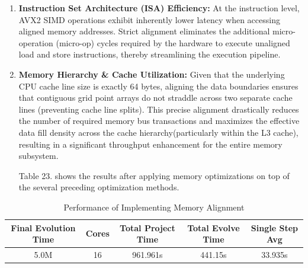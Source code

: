\begin{enumerate}
    \item \textbf{Instruction Set Architecture (ISA) Efficiency:} At the instruction level, AVX2 SIMD operations exhibit inherently lower latency when accessing aligned memory addresses. 
    Strict alignment eliminates the additional micro-operation (micro-op) cycles required by the hardware to execute unaligned load and store instructions, thereby streamlining the execution pipeline.
    
    \item \textbf{Memory Hierarchy \& Cache Utilization:} Given that the underlying CPU cache line size is exactly 64 bytes, aligning the data boundaries ensures that contiguous grid point arrays do not straddle across two separate cache lines (preventing cache line splits).
    This precise alignment drastically reduces the number of required memory bus transactions and maximizes the effective data fill density across the cache hierarchy(particularly within the L3 cache), resulting in a significant throughput enhancement for the entire memory subsystem.

Table 23. shows the results after applying memory optimizations on top of the several preceding optimization methods.
\end{enumerate}
\begin{table}[h]
    \centering
    \caption{Performance of Implementing Memory Alignment }
    \small %
    \begin{tabular}{|c|c|c|c|c|}
        \hline
        \textbf{Final Evolution Time }& \textbf{Cores} & \textbf{Total Project Time} &\textbf{Total Evolve Time} & \textbf{Single Step Avg} \\ \hline
        5.0M & 16 & 961.961s & 441.15s & 33.935s \\ \hline
    \end{tabular}
\end{table}


